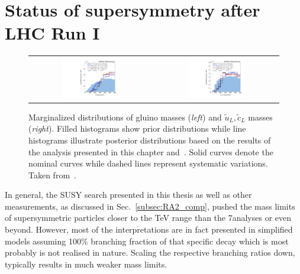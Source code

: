 \section{Status of supersymmetry after LHC Run I}
\label{sec:susy_status}
\begin{figure}[!t]
  \centering
  \begin{tabular}{cc}
                \includegraphics[width=0.49\textwidth]{figures/pMSSM_gluino.pdf} &
                \includegraphics[width=0.49\textwidth]{figures/pMSSM_squark.pdf} 
  \end{tabular}
\caption{Marginalized distributions of gluino masses (\textit{left}) and $\tilde{u}_L,\tilde{c}_L$ masses (\textit{right}). Filled histograms show prior distributions while line histograms illustrate posterior distributions based on the results of the analysis presented in this chapter and~\cite{Chatrchyan:2012lia}. Solid curves denote the nominal curves while dashed lines represent systematic variations. Taken from~\cite{CMS-PAS-SUS-13-020}.} 
  \label{fig:pMSSM}
\end{figure}
In general, the SUSY search presented in this thesis as well as other measurements, as discussed in Sec.~\ref{subsec:RA2_comp}, pushed the mass limits of supersymmetric particles closer to the TeV range than the 7\tev analyses or even beyond. However, most of the interpretations are in fact presented in simplified models assuming 100\% branching fraction of that specific decay which is most probably is not realised in nature. Scaling the respective branching ratios down, typically results in much weaker mass limits. \\
